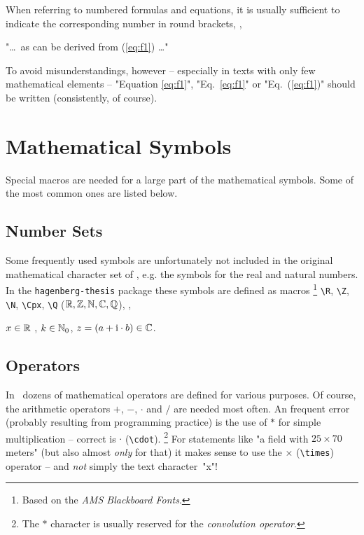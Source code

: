 When referring to numbered formulas and equations, it is usually sufficient
to indicate the corresponding number in round brackets, \eg,
%
\begin{center}
	"\ldots\ as can be derived from (\ref{eq:f1}) \ldots"
\end{center}
%
To avoid misunderstandings, however -- especially in texts with only few
mathematical elements -- "Equation \ref{eq:f1}", "Eq.~\ref{eq:f1}" or 
"Eq.~(\ref{eq:f1})" should be written (consistently, of course).
%
\begin{center}
	\setlength{\fboxrule}{0.2mm}
	\setlength{\fboxsep}{2mm}
\end{center}


\section{Mathematical Symbols}

Special macros are needed for a large part of the mathematical symbols. Some of
the most common ones are listed below.


\subsection{Number Sets}

Some frequently used symbols are unfortunately not included in the original 
mathematical character set of \latex, e.g. the symbols for the real and natural 
numbers. In the \texttt{hagenberg-thesis} package these symbols are defined
as macros%
\footnote{Based on the \emph{AMS Blackboard Fonts}.}
\verb!\R!, \verb!\Z!, \verb!\N!, \verb!\Cpx!, \verb!\Q! ($\R, \Z, \N, \Cpx, \Q$),
\eg,
%
\begin{center}
	$x \in \R$ , $k \in \N_0$, $z = (a + \mathrm{i} \cdot b) \in \Cpx$.
\end{center}


\subsection{Operators}

In \latex\ dozens of mathematical operators are defined for various purposes.
Of course, the arithmetic operators $+$, $-$, $\cdot$ and $/$ are needed most often.
An frequent error (probably resulting from programming practice) is the use
of $*$ for simple multiplication -- correct is $\cdot$ (\verb!\cdot!).%
\footnote{The $*$ character is usually reserved for the \emph{convolution operator}.}
%
For statements like "a field with $25 \times 70$ meters" (but also almost
\emph{only} for that) it makes sense to use the $\times$ (\verb!\times!) operator
-- and \emph{not} simply the text character~"x"!


